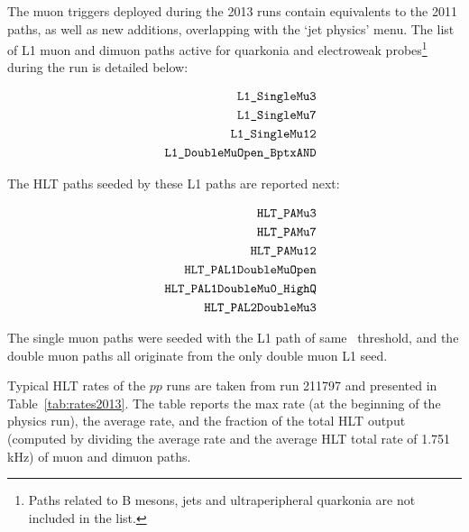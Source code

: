 The muon triggers deployed during the 2013 runs contain equivalents to
the 2011 paths, as well as new additions, overlapping with the `jet physics'
menu. The list of L1 muon and dimuon paths active for
quarkonia and electroweak probes\footnote{Paths related to B mesons,
  jets and ultraperipheral quarkonia are not included in the list.} during the run is detailed below:

\begin{eqnarray*}
& & \verb?L1_SingleMu3? \\
& & \verb?L1_SingleMu7? \\
& & \verb?L1_SingleMu12? \\
& & \verb?L1_DoubleMuOpen_BptxAND? 
\end{eqnarray*}

The HLT paths seeded by these L1 paths are reported next:

\begin{eqnarray*}
& & \verb?HLT_PAMu3? \\        
& & \verb?HLT_PAMu7? \\        
& & \verb?HLT_PAMu12? \\       
& & \verb?HLT_PAL1DoubleMuOpen? \\
& & \verb?HLT_PAL1DoubleMu0_HighQ? \\
& & \verb?HLT_PAL2DoubleMu3? \\
\end{eqnarray*}


The single muon paths were seeded with the L1 path of same \pt\
threshold, and the double muon paths all originate from the only
double muon L1 seed.




Typical HLT rates of the $pp$ runs are taken from run 211797 and
presented in Table~\ref{tab:rates2013}. The table reports the max rate
(at the beginning of the physics run), the average rate, and the
fraction of the total HLT output (computed by dividing the average
rate and the average HLT total rate of 1.751 kHz) of muon and dimuon paths.

